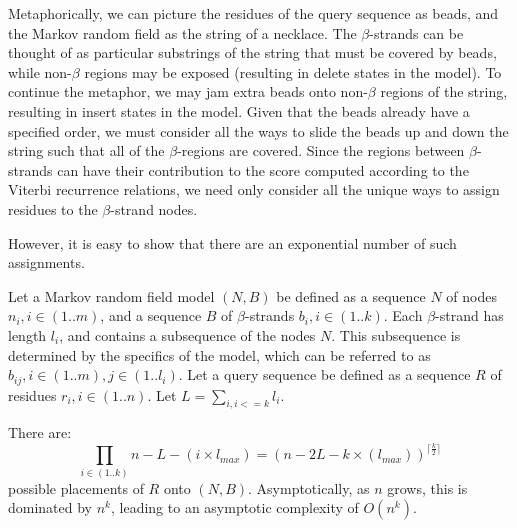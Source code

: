 \documentclass{acm_proc_article-sp}
\begin{document}
Metaphorically, we can picture the residues of the query sequence as beads,
and the Markov random field as the string of a necklace.
The $\beta$-strands can be thought of as particular substrings of the string 
that
must be covered by beads, while non-$\beta$ regions may be exposed (resulting in
delete states in the model).
To continue the metaphor, we may jam extra beads onto non-$\beta$ regions of the
string, resulting in insert states in the model.
Given that the beads already have a specified order, we must consider all the
ways to slide the beads up and down the string such that all of the 
$\beta$-regions
are covered.
Since the regions between $\beta$-strands can have their contribution to the
score computed according to the Viterbi recurrence relations, we need only
consider all the unique ways to assign residues to the $\beta$-strand nodes.

However, it is easy to show that there are an exponential number of such
assignments.

Let a Markov random field model $(N,B)$ be defined as a sequence $N$ of nodes 
$n_{i}, i \in (1..m)$, and a sequence $B$ of $\beta$-strands 
$b_{i}, i \in (1..k)$.
Each $\beta$-strand has length $l_{i}$, and contains a subsequence of the nodes
$N$.
This subsequence is determined by the
specifics of the model, which can be referred to as $b_{ij}, i \in (1..m), j \in
(1..l_{i})$.
Let a query sequence be defined as a sequence $R$ of residues
$r_{i}, i \in (1..n)$.
Let $L = \displaystyle \sum \limits_{i, i <= k} l_{i}$.

There are:
\begin{equation}
  \prod_{i \in (1..k)}{n - L - (i \times l_{max})} = 
  (n - 2L - k\times(l_{max}))^{\lceil \frac{k}{2} \rceil}
\end{equation}
possible placements of $R$ onto $(N,B)$.
Asymptotically, as $n$ grows, this is dominated by $n^k$, leading to an
asymptotic complexity of $O(n^k)$.
\end{document}

